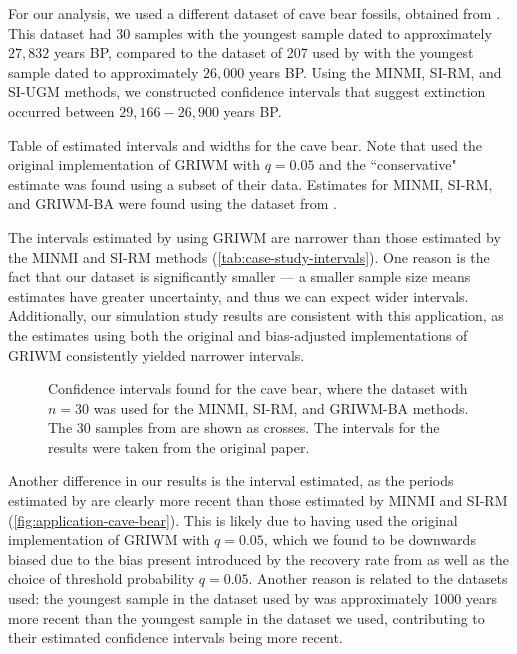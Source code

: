 For our analysis, we used a different dataset of cave bear fossils, obtained from \citet{Cooper2015}. This dataset had 30 samples with the youngest sample dated to approximately $27,832$ years BP, compared to the dataset of 207 used by \citet{Baca2016} with the youngest sample dated to approximately $26,000$ years BP. Using the MINMI, SI-RM, and SI-UGM methods, we constructed confidence intervals that suggest extinction occurred between $29,166 - 26,900$ years BP.
\begin{table}[ht]
    \centering
    \caption{Table of estimated intervals and widths for the cave bear. Note that \citet{Baca2016} used the original implementation of GRIWM with $q=0.05$ and the ``conservative" estimate was found using a subset of their data. Estimates for MINMI, SI-RM, and GRIWM-BA were found using the dataset from \citet{Cooper2015}.}
    
    \label{tab:case-study-intervals}
    \vspace{-4mm}
\end{table}

The intervals estimated by \citet{Baca2016} using GRIWM are narrower than those estimated by the MINMI and SI-RM methods (\autoref{tab:case-study-intervals}). One reason is the fact that our dataset is significantly smaller --- a smaller sample size means estimates have greater uncertainty, and thus we can expect wider intervals. Additionally, our simulation study results are consistent with this application, as the estimates using both the original and bias-adjusted implementations of GRIWM consistently yielded narrower intervals.
\begin{figure}[ht]
    \centering
    
    \caption{Confidence intervals found for the cave bear, where the \citet{Cooper2015} dataset with $n=30$ was used for the MINMI, SI-RM, and GRIWM-BA methods. The 30 samples from \citet{Cooper2015} are shown as crosses. The intervals for the \citet{Baca2016} results were taken from the original paper.}
    \label{fig:application-cave-bear}
\end{figure}

Another difference in our results is the interval estimated, as the periods estimated by \citet{Baca2016} are clearly more recent than those estimated by MINMI and SI-RM (\autoref{fig:application-cave-bear}). This is likely due to \citet{Baca2016} having used the original implementation of GRIWM with $q = 0.05$, which we found to be downwards biased due to the bias present introduced by the recovery rate from \citet{Mcinerny2006} as well as the choice of threshold probability $q=0.05$. Another reason is related to the datasets used: the youngest sample in the dataset used by \citet{Baca2016} was approximately 1000 years more recent than the youngest sample in the dataset we used, contributing to their estimated confidence intervals being more recent.